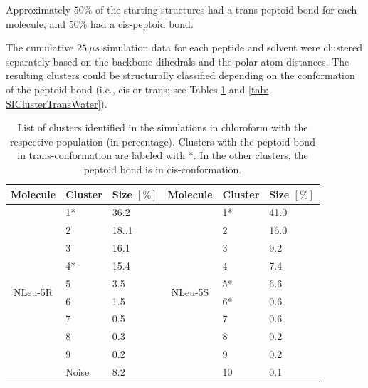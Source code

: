 Approximately $50\%$ of the starting structures had a trans-peptoid bond for each molecule, and $50\%$ had a cis-peptoid bond. 

The cumulative $25~μs$ simulation data for each peptide and solvent were clustered separately based on the backbone dihedrals and the polar atom distances. The resulting clusters could be structurally classified depending on the conformation of the peptoid bond (i.e., cis or trans; see Tables \ref{tab:SIClusterTransCHCL3} and \ref{tab: SIClusterTransWater}). 

\begin{table}[]
\center
\caption{List  of  clusters  identified  in  the  simulations  in  chloroform  with  the  respective 
population  (in  percentage).  Clusters  with  the  peptoid  bond  in  trans-conformation  are 
labeled with *. In the other clusters, the peptoid bond is in cis-conformation.}
\label{tab:SIClusterTransCHCL3}
\begin{tabular}{c|ll||c|ll}
Molecule                  & Cluster & Size $[\%]$ & Molecule                  & Cluster & Size $[\%]$ \\
\hline
\multirow{11}{*}{NLeu-5R} & 1*      & 36.2        & \multirow{11}{*}{NLeu-5S} & 1*      & 41.0        \\
                          & 2       & 18..1       &                           & 2       & 16.0        \\
                          & 3       & 16.1        &                           & 3       & 9.2         \\
                          & 4*      & 15.4        &                           & 4       & 7.4         \\
                          & 5       & 3.5         &                           & 5*      & 6.6         \\
                          & 6       & 1.5         &                           & 6*      & 0.6         \\
                          & 7       & 0.5         &                           & 7       & 0.6         \\
                          & 8       & 0.3         &                           & 8       & 0.2         \\
                          & 9       & 0.2         &                           & 9       & 0.2         \\
                          & Noise   & 8.2         &                           & 10      & 0.1         \\

\end{tabular}
\end{table}
